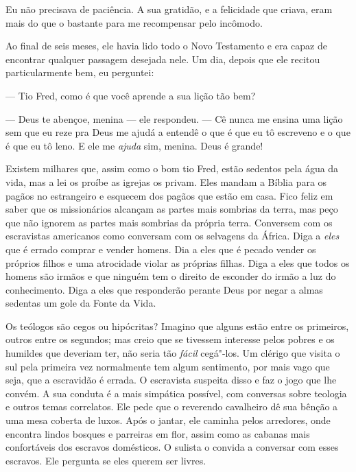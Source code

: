 Eu não precisava de paciência. A sua
gratidão, e a felicidade que criava, eram mais do que o bastante para me
recompensar pelo incômodo.

Ao final de seis meses, ele havia lido
todo o Novo Testamento e era capaz de encontrar qualquer passagem
desejada nele. Um dia, depois que ele recitou particularmente bem, eu
perguntei:

--- Tio Fred, como é que você aprende a sua lição tão bem?

--- Deus te abençoe, menina --- ele
respondeu. --- Cê nunca me ensina uma lição sem que eu reze pra Deus me
ajudá a entendê o que é que eu tô escreveno e o que é que eu tô leno. E
ele me \emph{ajuda} sim, menina. Deus é grande!

Existem milhares que, assim como o bom
tio Fred, estão sedentos pela água da vida, mas a lei os proíbe as
igrejas os privam. Eles mandam a Bíblia para os pagãos no estrangeiro e
esquecem dos pagãos que estão em casa. Fico feliz em saber que os
missionários alcançam as partes mais sombrias da terra, mas peço que não
ignorem as partes mais sombrias da própria terra. Conversem com os
escravistas americanos como conversam com os selvagens da África. Diga a
\emph{eles} que é errado comprar e vender homens. Dia a eles que é
pecado vender os próprios filhos e uma atrocidade violar as próprias
filhas. Diga a eles que todos os homens são irmãos e que ninguém tem o
direito de esconder do irmão a luz do conhecimento. Diga a eles que
responderão perante Deus por negar a almas sedentas um gole da Fonte da
Vida.


Os teólogos são cegos ou hipócritas?
Imagino que alguns estão entre os primeiros, outros entre os segundos;
mas creio que se tivessem interesse pelos pobres e os humildes que
deveriam ter, não seria tão \emph{fácil} cegá"-los. Um clérigo que visita
o sul pela primeira vez normalmente tem algum sentimento, por mais vago
que seja, que a escravidão é errada. O escravista suspeita disso e faz o
jogo que lhe convém. A sua conduta é a mais simpática possível, com
conversas sobre teologia e outros temas correlatos. Ele pede que o
reverendo cavalheiro dê sua bênção a uma mesa coberta de luxos. Após o
jantar, ele caminha pelos arredores, onde encontra lindos bosques e
parreiras em flor, assim como as cabanas mais confortáveis dos escravos
domésticos. O sulista o convida a conversar com esses escravos. Ele
pergunta se eles querem ser livres.

